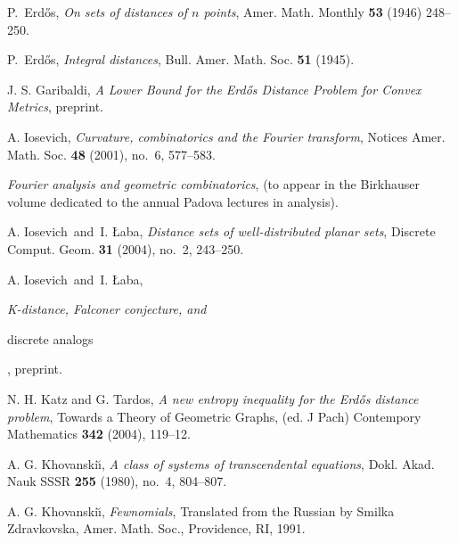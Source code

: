 \documentclass[]{stml-l}
\numberwithin{equation}{chapter}
\theoremstyle{plain}
\theoremstyle{definition}
\theoremstyle{remark}
\begin{document}
\begin{thebibliography}{55}
 P.~Erd\H{o}s,
{\it On sets of distances of $n$ points},
Amer. Math. Monthly {\bf 53}  (1946) 248--250.

 P.~Erd\H{o}s,
{\it Integral distances},  Bull. Amer. Math. Soc.
{\bf 51}  (1945).

 J. S. Garibaldi, {\it A Lower Bound
for the Erd\H{o}s Distance Problem for Convex Metrics},
preprint.

 A. Iosevich, {\it Curvature, combinatorics
and the Fourier transform}, Notices Amer. Math. Soc.
{\bf 48} (2001), no.~6, 577--583.

{\it Fourier analysis and geometric combinatorics}, (to appear in
the Birkhauser volume dedicated to the annual Padova lectures in
analysis).

  A. Iosevich\ and\ I. \L aba,
{\it Distance sets of well-distributed planar sets},
Discrete Comput. Geom. {\bf 31} (2004), no.~2, 243--250.


 A. Iosevich\ and\ I. \L aba,
{\it K-distance, Falconer conjecture, and

discrete analogs}, preprint.


 N. H. Katz and G. Tardos, {\it A new entropy inequality for the Erd\H{o}s distance problem}, Towards a Theory of Geometric Graphs,  (ed. J Pach) Contempory Mathematics {\bf 342} (2004), 119--12.

 A. G. Khovanski\u\i, {\it A class of systems of transcendental equations}, Dokl. Akad. Nauk SSSR {\bf 255} (1980), no.~4, 804--807.

 A. G. Khovanski\u\i, {\it Fewnomials}, Translated from the Russian by Smilka Zdravkovska,
Amer. Math. Soc., Providence, RI, 1991.


%




%


\end{thebibliography}
\end{document}
